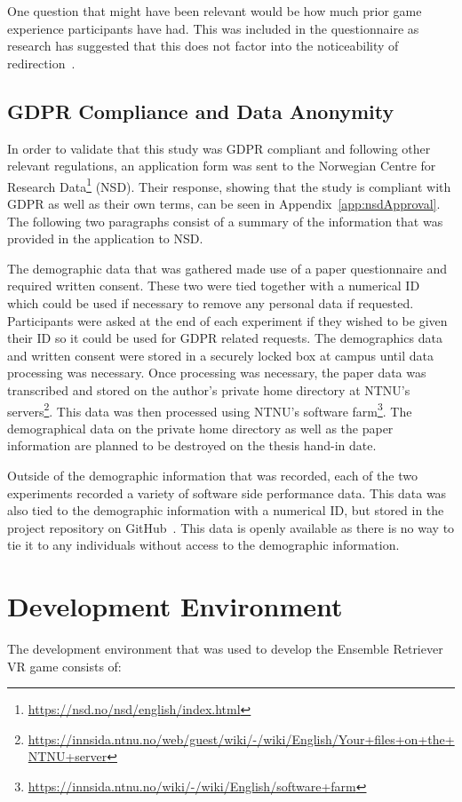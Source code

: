 One question that might have been relevant would be how much prior game experience participants have had. This was included in the questionnaire as research has suggested that this does not factor into the noticeability of redirection~\cite{nguyen2018individual}.

\subsection{GDPR Compliance and Data Anonymity}
In order to validate that this study was GDPR compliant and following other relevant regulations, an application form was sent to the Norwegian Centre for Research Data\footnote{\url{https://nsd.no/nsd/english/index.html}} (NSD). Their response, showing that the study is compliant with GDPR as well as their own terms, can be seen in Appendix~\ref{app:nsdApproval}. The following two paragraphs consist of a summary of the information that was provided in the application to NSD.

The demographic data that was gathered made use of a paper questionnaire and required written consent. These two were tied together with a numerical ID which could be used if necessary to remove any personal data if requested. Participants were asked at the end of each experiment if they wished to be given their ID so it could be used for GDPR related requests. The demographics data and written consent were stored in a securely locked box at campus until data processing was necessary. Once processing was necessary, the paper data was transcribed and stored on the author's private home directory at NTNU's servers\footnote{\url{https://innsida.ntnu.no/web/guest/wiki/-/wiki/English/Your+files+on+the+NTNU+server}}. This data was then processed using NTNU's software farm\footnote{\url{https://innsida.ntnu.no/wiki/-/wiki/English/software+farm}}. The demographical data on the private home directory as well as the paper information are planned to be destroyed on the thesis hand-in date.

Outside of the demographic information that was recorded, each of the two experiments recorded a variety of software side performance data. This data was also tied to the demographic information with a numerical ID, but stored in the project repository on GitHub~\cite{projectRepository}. This data is openly available as there is no way to tie it to any individuals without access to the demographic information.

\section{Development Environment}
The development environment that was used to develop the Ensemble Retriever VR game consists of: 


